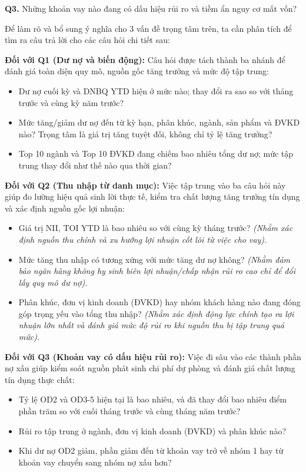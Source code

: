 \documentclass[12pt]{eDA_conquer2026}
\begin{document}
\noindent \textbf{Q3.} Những khoản vay nào đang có dấu hiệu rủi ro và tiềm ẩn nguy cơ mất vốn?

\vspace{0.2cm}
Để làm rõ và bổ sung ý nghĩa cho 3 vấn đề trọng tâm trên, ta cần phân tích để tìm ra câu trả lời cho các câu hỏi chi tiết sau:

\vspace{0.2cm}
\noindent \textbf{Đối với Q1 (Dư nợ và biến động):} Câu hỏi được tách thành ba nhánh để đánh giá toàn diện quy mô, nguồn gốc tăng trưởng và mức độ tập trung:
\begin{itemize}[label=--, leftmargin=0.8cm, itemsep=0.2em]
    \item Dư nợ cuối kỳ và DNBQ YTD hiện ở mức nào; thay đổi ra sao so với tháng trước và cùng kỳ năm trước?
    \item Mức tăng/giảm dư nợ đến từ kỳ hạn, phân khúc, ngành, sản phẩm và ĐVKD nào? Trọng tâm là giá trị tăng tuyệt đối, không chỉ tỷ lệ tăng trưởng?
    \item Top 10 ngành và Top 10 ĐVKD đang chiếm bao nhiêu tổng dư nợ; mức tập trung thay đổi như thế nào qua thời gian?
\end{itemize}

\vspace{0.2cm}
\noindent \textbf{Đối với Q2 (Thu nhập từ danh mục):} Việc tập trung vào ba câu hỏi này giúp đo lường hiệu quả sinh lời thực tế, kiểm tra chất lượng tăng trưởng tín dụng và xác định nguồn gốc lợi nhuận:
\begin{itemize}[label=--, leftmargin=0.8cm, itemsep=0.2em]
    \item Giá trị NII, TOI YTD là bao nhiêu so với cùng kỳ tháng trước? \textit{(Nhằm xác định nguồn thu chính và xu hướng lợi nhuận cốt lõi từ việc cho vay).}
    \item Mức tăng thu nhập có tương xứng với mức tăng dư nợ không? \textit{(Nhằm đảm bảo ngân hàng không hy sinh biên lợi nhuận/chấp nhận rủi ro cao chỉ để đổi lấy quy mô dư nợ).}
    \item Phân khúc, đơn vị kinh doanh (ĐVKD) hay nhóm khách hàng nào đang đóng góp trọng yếu vào tổng thu nhập? \textit{(Nhằm xác định động lực chính tạo ra lợi nhuận lớn nhất và đánh giá mức độ rủi ro khi nguồn thu bị tập trung quá mức).}
\end{itemize}

\vspace{0.2cm}
\noindent \textbf{Đối với Q3 (Khoản vay có dấu hiệu rủi ro):} Việc đi sâu vào các thành phần nợ xấu giúp kiểm soát nguồn phát sinh chi phí dự phòng và đánh giá chất lượng tín dụng thực chất:
\begin{itemize}[label=--, leftmargin=0.8cm, itemsep=0.2em]
    \item Tỷ lệ OD2 và OD3-5 hiện tại là bao nhiêu, và đã thay đổi bao nhiêu điểm phần trăm so với cuối tháng trước và cùng tháng năm trước?
    \item Rủi ro tập trung ở ngành, đơn vị kinh doanh (ĐVKD) và phân khúc nào?
    \item Khi dư nợ OD2 giảm, phần giảm đến từ khoản vay trở về nhóm 1 hay từ khoản vay chuyển sang nhóm nợ xấu hơn?
\end{itemize}
\end{document}
